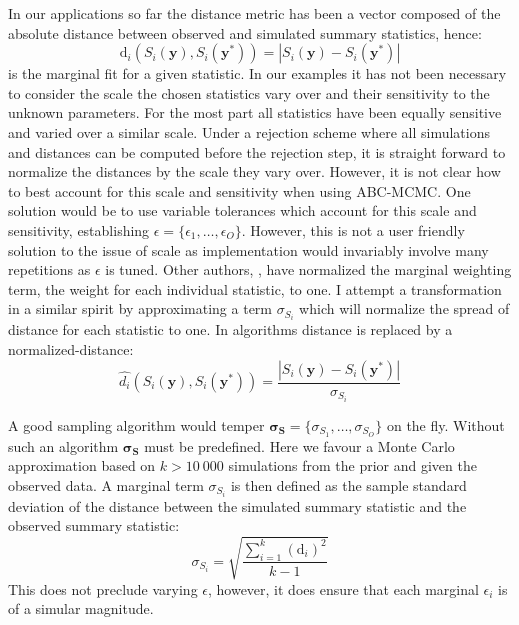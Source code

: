 In our applications so far the distance metric has been a vector composed of the absolute distance between observed and simulated summary statistics, hence:
\begin{equation}
\text{d}_i(S_i(\bm{y}),S_i(\bm{y^*})) = |S_i(\bm{y})-S_i(\bm{y^*})|
\label{marginal_distance}
\end{equation}
is the marginal fit for a given statistic. In our examples it has not been necessary to consider the scale the chosen statistics vary over and their sensitivity to the unknown parameters. For the most part all statistics have been equally sensitive and varied over a similar scale. Under a rejection scheme where all simulations and distances can be computed before the rejection step, it is straight forward to normalize the distances by the scale they vary over. However, it is not clear how to best account for this scale and sensitivity when using ABC-MCMC. One solution would be to use variable tolerances which account for this scale and sensitivity, establishing $\epsilon = \{\epsilon_1,\dots,\epsilon_O\}$. However, this is not a user friendly solution to the issue of scale as implementation would invariably involve many repetitions as $\epsilon$ is tuned. Other authors, \citet{Ratmann2010}, have normalized the marginal weighting term, the weight for each individual statistic, to one. I attempt a transformation in a similar spirit by approximating a term $\sigma_{S_i}$ which will normalize the spread of distance for each statistic to one. In algorithms distance is replaced by a normalized-distance:
\begin{equation}
\hat{d_i}(S_i(\bm{y}),S_i(\bm{y^*})) =  \frac{|S_i(\bm{y})-S_i(\bm{y^*})|}{\sigma_{S_i}}
\end{equation}

A good sampling algorithm would temper $\bm{\sigma_S} = \{\sigma_{S_1},\dots,\sigma_{S_O}\}$ on the fly. Without such an algorithm $\bm{\sigma_S}$ must be predefined. Here we favour a Monte Carlo approximation based on $k > 10\ 000$ simulations from the prior and given the observed data. A marginal term $\sigma_{S_i}$ is then defined as the sample standard deviation of the distance between the simulated summary statistic and the observed summary statistic:
\begin{equation}
\sigma_{S_i} = \sqrt{\frac{\sum_{i = 1}^{k}(\text{d}_i)^2}{k-1}}
\end{equation}
This does not preclude varying $\epsilon$, however, it does ensure that each marginal $\epsilon_i$ is of a simular magnitude. \\



